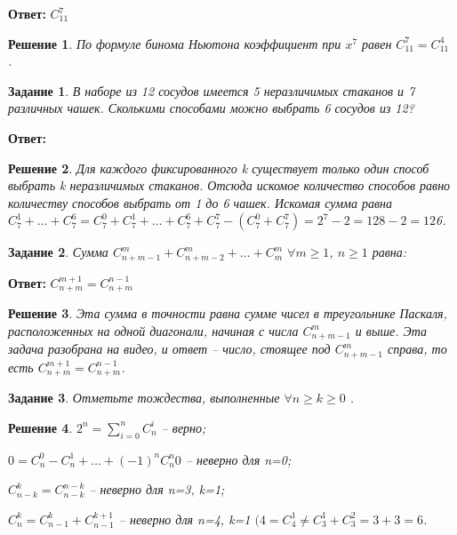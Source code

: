 \documentclass[a4paper,oneside]{memoir}
\newtheorem{task}{Задание}
\newtheorem{solution}{Решение}
\begin{document}
\textbf{Ответ:} $ C_{11}^7 $

\begin{solution}
	По формуле бинома Ньютона коэффициент при $ x^7 $ равен $ C_{11}^7 = C_{11}^4 $ .
\end{solution}

\hrulefill

\begin{task}
	В наборе из 12 сосудов имеется 5 неразличимых стаканов и 7 различных чашек. Сколькими способами можно выбрать 6 сосудов из 12?
\end{task}

\textbf{Ответ:} $  $

\begin{solution}
	Для каждого фиксированного k существует только один способ выбрать k неразличимых стаканов. Отсюда искомое количество способов равно количеству способов выбрать от 1 до 6 чашек. Искомая сумма равна $ C_{7}^1+ \ldots + C_{7}^6 =C_{7}^0+ C_{7}^1+ \ldots + C_{7}^6 + C_7^7 - (C_7^0+C_7^7) = 2^{7} - 2 =128-2=12 $6.
\end{solution}

\hrulefill

\begin{task}
	Сумма $ C_{n+m-1}^m+C_{n+m-2}^m+\ldots + C_{m}^m $ $\forall m \ge 1 $, $ n \ge 1 $ равна:
\end{task}

\textbf{Ответ:} $ C_{n+m}^{m+1} = C_{n+m}^{n-1} $

\begin{solution}
	Эта сумма в точности равна сумме чисел в треугольнике Паскаля, расположенных на одной диагонали, начиная с числа $ C_{n + m - 1}^m $ и выше. Эта задача разобрана на видео, и ответ -- число, стоящее под $ C_{n+m-1}^m $ справа, то есть $ C_{n+m}^{m+1} = C_{n+m}^{n-1} $.
\end{solution}

\hrulefill

\begin{task}
	Отметьте тождества, выполненные $ \forall n \ge k \ge 0$ .
\end{task}

\begin{solution}
	
	$ 2^n = \sum\limits_{i=0}^{n}C_{n}^i $ -- верно;
	
	
	$ 0 = C_n^0 - C_n^1 + \ldots + (-1)^n C_n^n0 $ -- неверно для n=0;
	
	
	$ C_{n-k}^k = C_{n-k}^{n-k} $ -- неверно для n=3, k=1;
	
	
	$ C_{n}^k = C_{n-1}^k + C_{n-1}^{k+1} $ -- неверно для n=4, k=1 $ (4=C_4^1 \neq C_3^1 + C_3^2 = 3 + 3 =6 $.
\end{solution}
\end{document}
